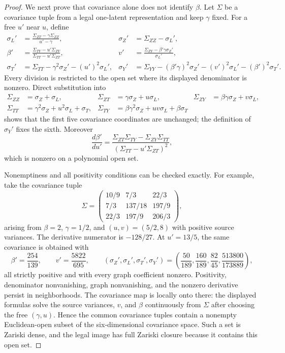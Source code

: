 \documentclass{article}
\begin{document}
\begin{proof}
We next prove that covariance alone does not identify \(\beta\).  Let \(\Sigma\) be a covariance tuple from a legal one-latent representation and keep \(\gamma\) fixed.  For a free \(u'\) near \(u\), define
\[
\begin{aligned}
 \sigma_L'&=\frac{\Sigma_{ZT}-\gamma\Sigma_{ZZ}}{u'-\gamma},
 &\sigma_Z'&=\Sigma_{ZZ}-\sigma_L',\\
 \beta'&=\frac{\Sigma_{TY}-u'\Sigma_{ZY}}
                   {\Sigma_{TT}-u'\Sigma_{ZT}},
 &v'&=\frac{\Sigma_{ZY}-\beta'\gamma\sigma_Z'}{\sigma_L'},\\
 \sigma_T'&=\Sigma_{TT}-\gamma^2\sigma_Z'-(u')^2\sigma_L',
 &\sigma_Y'&=\Sigma_{YY}-(\beta'\gamma)^2\sigma_Z'-(v')^2\sigma_L'-(\beta')^2\sigma_T'.
\end{aligned}
\]
Every division is restricted to the open set where its displayed denominator is nonzero.  Direct substitution into
\[
\begin{aligned}
 \Sigma_{ZZ}&=\sigma_Z+\sigma_L,&
 \Sigma_{ZT}&=\gamma\sigma_Z+u\sigma_L,&
 \Sigma_{ZY}&=\beta\gamma\sigma_Z+v\sigma_L,\\
 \Sigma_{TT}&=\gamma^2\sigma_Z+u^2\sigma_L+\sigma_T,&
 \Sigma_{TY}&=\beta\gamma^2\sigma_Z+uv\sigma_L+\beta\sigma_T
\end{aligned}
\]
shows that the first five covariance coordinates are unchanged; the definition of \(\sigma_Y'\) fixes the sixth.  Moreover
\[
 \frac{d\beta'}{du'}
 =\frac{\Sigma_{ZT}\Sigma_{TY}-\Sigma_{ZY}\Sigma_{TT}}
        {(\Sigma_{TT}-u'\Sigma_{ZT})^2},
\]
which is nonzero on a polynomial open set.

Nonemptiness and all positivity conditions can be checked exactly.  For example, take the covariance tuple
\[
 \Sigma=
 \begin{pmatrix}
 10/9&7/3&22/3\\
 7/3&137/18&197/9\\
 22/3&197/9&206/3
 \end{pmatrix},
\]
arising from \(\beta=2\), \(\gamma=1/2\), and \((u,v)=(5/2,8)\) with positive source variances.  The derivative numerator is \(-128/27\).  At \(u'=13/5\), the same covariance is obtained with
\[
 \beta'=\frac{254}{139},\qquad
 v'=\frac{5822}{695},\qquad
 (\sigma_Z',\sigma_L',\sigma_T',\sigma_Y')
 =\left(\frac{50}{189},\frac{160}{189},\frac{82}{45},
 \frac{513800}{173889}\right),
\]
all strictly positive and with every graph coefficient nonzero.  Positivity, denominator nonvanishing, graph nonvanishing, and the nonzero derivative persist in neighborhoods.  The covariance map is locally onto there: the displayed formulas solve the source variances, \(v\), and \(\beta\) continuously from \(\Sigma\) after choosing the free \((\gamma,u)\).  Hence the common covariance tuples contain a nonempty Euclidean-open subset of the six-dimensional covariance space.  Such a set is Zariski dense, and the legal image has full Zariski closure because it contains this open set.


\end{proof}
\end{document}
